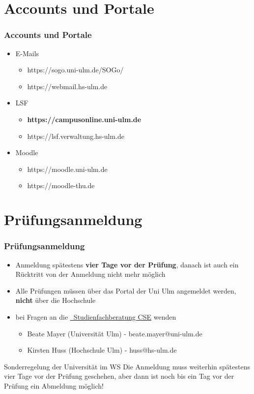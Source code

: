\documentclass[10pt,a4paper]{beamer}
\begin{document}
\section{Accounts und Portale}
\begin{frame}
\frametitle{Accounts und Portale}
\begin{itemize}
	\setlength{\itemsep}{10pt} %
	\item E-Mails
		\begin{itemize}
		\setlength{\itemsep}{10pt} %
			\item https://sogo.uni-ulm.de/SOGo/
			\item https://webmail.hs-ulm.de
		\end{itemize}
	\item LSF
		\begin{itemize}
		\setlength{\itemsep}{10pt} %
			\item \textbf{https://campusonline.uni-ulm.de}
			\item https://lsf.verwaltung.hs-ulm.de
		\end{itemize}
	\item Moodle
		\begin{itemize}
		\setlength{\itemsep}{10pt} %
			\item https://moodle.uni-ulm.de
			\item https://moodle-thu.de
		\end{itemize}
\end{itemize}
\end{frame}

\section{Prüfungsanmeldung}
\begin{frame}
\frametitle{Prüfungsanmeldung}
\begin{itemize}
	\setlength{\itemsep}{10pt} %
	\item Anmeldung spätestens \textbf{vier Tage vor der Prüfung}, danach ist auch ein Rücktritt von der Anmeldung nicht mehr möglich
	\item Alle Prüfungen müssen über das Portal der Uni Ulm angemeldet werden, \textbf{nicht} über die Hochschule
	\item bei Fragen an die \href{https://www.uni-ulm.de/mawi/mawi-cse/studienfachberatung/}{\Mundus~Studienfachberatung CSE} wenden
	\begin{itemize}
		\setlength{\itemsep}{10pt} %
		\item Beate Mayer (Universität Ulm) - beate.mayer@uni-ulm.de
		\item Kirsten Huss (Hochschule Ulm) - huss@hs-ulm.de
	\end{itemize}
\end{itemize}
\begin{alertblock}{Sonderregelung der Universität im WS}
Die Anmeldung muss weiterhin spätestens vier Tage vor der Prüfung geschehen, aber dann ist noch bis ein Tag vor der Prüfung ein Abmeldung möglich!
\end{alertblock}
\end{frame}
\end{document}

